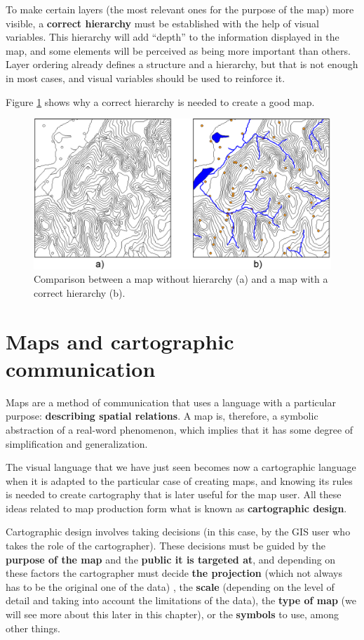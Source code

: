 To make certain layers (the most relevant ones for the purpose of the map) more visible, a \textbf{correct hierarchy} must be established with the help of visual variables. This hierarchy will add ``depth'' to the information displayed in the map, and some elements will be perceived as being more important than others. Layer ordering already defines a structure and a hierarchy, but that is not enough in most cases, and visual variables should be used to reinforce it.

Figure \ref{Fig:HierarchyMap} shows why a correct hierarchy is needed to create a good map.

\begin{figure}[!hbt]
\centering
\includegraphics[width=\columnwidth]{Visualization/HierarchyMap.png}
\caption{\small Comparison between a map without hierarchy (a) and a map with a correct hierarchy (b).}
\label{Fig:HierarchyMap} 
\end{figure}


\section{Maps and cartographic communication}

Maps are a method of communication that uses a language with a particular purpose: \textbf{describing spatial relations}. A map is, therefore, a symbolic abstraction of a real-word phenomenon, which implies that it has some degree of simplification and generalization.

The visual language that we have just seen becomes now a cartographic language when it is adapted to the particular case of creating maps, and knowing its rules is needed to create cartography that is later useful for the map user. All these ideas related to map production form what is known as \textbf{cartographic design}.

Cartographic design involves taking decisions (in this case, by the GIS user who takes the role of the cartographer). These decisions must be guided by the \textbf{purpose of the map} and the \textbf{public it is targeted at}, and depending on these factors the cartographer must decide \textbf{the projection} (which not always has to be the original one of the data) 
, the \textbf{scale} (depending on the level of detail and taking into account the limitations of the data), the \textbf{type of map} (we will see more about this later in this chapter), or the \textbf{symbols} to use, among other things.

